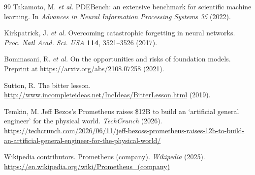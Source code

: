 \documentclass[11pt,a4paper]{article}
\begin{document}
\begin{thebibliography}{99}
 Takamoto, M. \emph{et al.}
PDEBench: an extensive benchmark for scientific machine learning. In
\emph{Advances in Neural Information Processing Systems 35} (2022).

 Kirkpatrick, J.
\emph{et al.} Overcoming catastrophic forgetting in neural networks.
\emph{Proc. Natl Acad. Sci. USA} \textbf{114}, 3521--3526 (2017).

 Bommasani, R. \emph{et al.}
On the opportunities and risks of foundation models. Preprint at
\url{https://arxiv.org/abs/2108.07258} (2021).

 Sutton, R. The bitter lesson.
\url{http://www.incompleteideas.net/IncIdeas/BitterLesson.html} (2019).

 Temkin, M. Jeff Bezos's Prometheus
raises \$12B to build an `artificial general engineer' for the physical
world. \emph{TechCrunch} (2026).
\url{https://techcrunch.com/2026/06/11/jeff-bezoss-prometheus-raises-12b-to-build-an-artificial-general-engineer-for-the-physical-world/}

 Wikipedia
contributors. Prometheus (company). \emph{Wikipedia} (2025).
\url{https://en.wikipedia.org/wiki/Prometheus_(company)}

\end{thebibliography}
\end{document}
